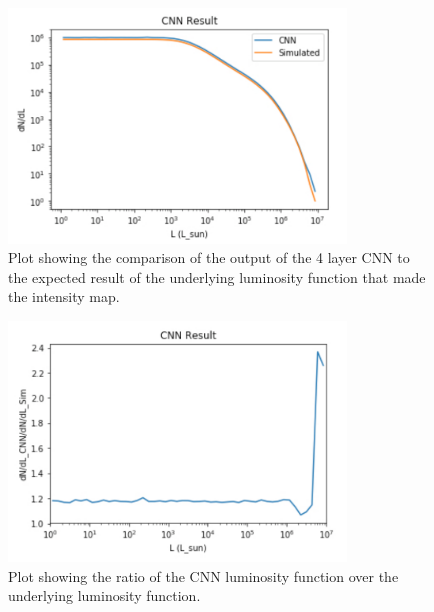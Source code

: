\documentclass{article}
\begin{document}
			\begin{figure}[H]
				\centering
				\includegraphics[width=0.8\textwidth]{CNN_4_layer_log_unlog.pdf}
				\caption{Plot showing the comparison of the output of the 4 layer CNN to the expected result of the underlying luminosity function that made the intensity map.}
				\label{fig:CNN_4_layer_log_unlog}
			\end{figure}

			\begin{figure}[H]
				\centering
				\includegraphics[width=0.8\textwidth]{CNN_4_layer_log_unlog_ratio.pdf}
				\caption{Plot showing the ratio of the CNN luminosity function over the underlying luminosity function.}
				\label{fig:CNN_4_layer_log_unlog_ratio}
			\end{figure}
\end{document}
